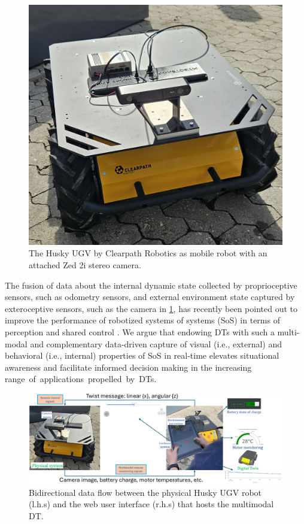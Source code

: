 \documentclass[conference]{IEEEtran}
\begin{document}
\begin{figure}[t!]
	\centerline{\includegraphics[width=8.cm]{Pictures/huskyzed2.jpg}}
	\caption{The Husky UGV by Clearpath Robotics as mobile robot with an attached Zed 2i stereo camera.}
	\label{fig:huskyClearpath}
\end{figure} 

The fusion of data  about the internal dynamic state collected by proprioceptive sensors, such as  odometry sensors, and external environment state captured by exteroceptive sensors, such as the camera in \cref{fig:huskyClearpath}, has  recently been pointed out to improve the performance of robotized systems of systems (SoS) in terms of perception and shared control \cite{chen2023enabling,kaigom}. We argue that endowing DTs with such a multi-modal and complementary  data-driven capture of visual (i.e., external) and behavioral (i.e., internal)  properties of SoS in real-time elevates situational awareness and facilitate informed decision making in the increasing \mbox{range of applications  propelled by DTs.} %

\begin{figure}[t]
	\centerline{\includegraphics[width=15.35cm]{Pictures/loop.png}}
	\caption{Bidirectional data flow between the physical Husky UGV robot (l.h.s) and the web user interface (r.h.s) that hosts the multimodal DT.}
	\label{fig:loop}
\end{figure}
 
\end{document}
